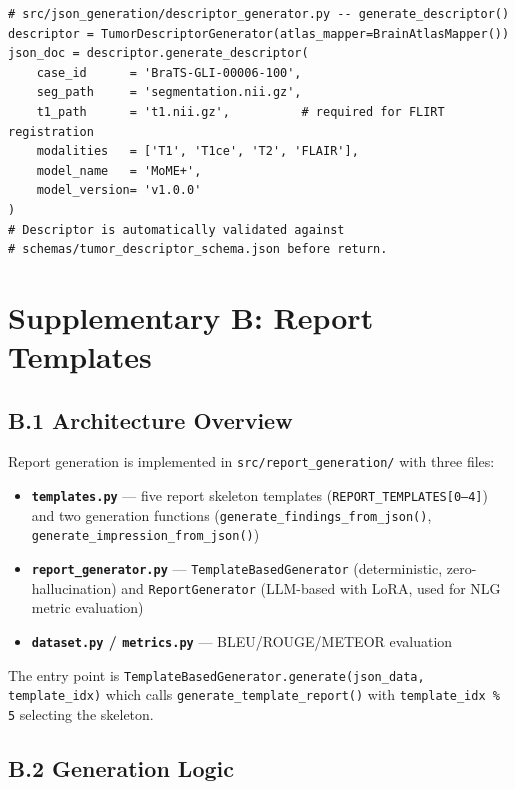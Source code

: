 \documentclass[conference]{IEEEtran}
\begin{document}
\begin{lstlisting}[style=pycode]
# src/json_generation/descriptor_generator.py -- generate_descriptor()
descriptor = TumorDescriptorGenerator(atlas_mapper=BrainAtlasMapper())
json_doc = descriptor.generate_descriptor(
    case_id      = 'BraTS-GLI-00006-100',
    seg_path     = 'segmentation.nii.gz',
    t1_path      = 't1.nii.gz',          # required for FLIRT registration
    modalities   = ['T1', 'T1ce', 'T2', 'FLAIR'],
    model_name   = 'MoME+',
    model_version= 'v1.0.0'
)
# Descriptor is automatically validated against
# schemas/tumor_descriptor_schema.json before return.
\end{lstlisting}

\section*{Supplementary B: Report Templates}

\subsection*{B.1 Architecture Overview}

Report generation is implemented in \texttt{src/report\_generation/} with three files:

\begin{itemize}
    \item \textbf{\texttt{templates.py}} — five report skeleton templates (\texttt{REPORT\_TEMPLATES[0--4]}) and two generation functions (\texttt{generate\_findings\_from\_json()}, \texttt{generate\_impression\_from\_json()})
    \item \textbf{\texttt{report\_generator.py}} — \texttt{TemplateBasedGenerator} (deterministic, zero-hallucination) and \texttt{ReportGenerator} (LLM-based with LoRA, used for NLG metric evaluation)
    \item \textbf{\texttt{dataset.py} / \texttt{metrics.py}} — BLEU/ROUGE/METEOR evaluation
\end{itemize}

The entry point is \texttt{TemplateBasedGenerator.generate(json\_data, template\_idx)} which calls \texttt{generate\_template\_report()} with \texttt{template\_idx \% 5} selecting the skeleton.

\subsection*{B.2 Generation Logic}
\end{document}
